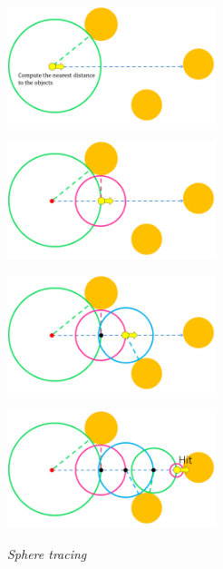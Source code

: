 \begin{figure}[htbp]
 \begin{minipage}[t]{0.5\hsize}
  \center
  \includegraphics[height=1.35in, keepaspectratio]{img/visualization/sphereTracing1.png}
  \subcaption{\textit{}}
  \label{fig:st1}
  \hspace*{\fill}
 \end{minipage}
 \begin{minipage}[t]{0.5\hsize}
  \center
  \includegraphics[height=1.35in, keepaspectratio]{img/visualization/sphereTracing2.png}
  \subcaption{\textit{}}
  \label{fig:st2}
  \hspace*{\fill}
 \end{minipage}
 \begin{minipage}[t]{0.5\hsize}
  \center
  \includegraphics[height=1.35in, keepaspectratio]{img/visualization/sphereTracing3.png}
  \subcaption{\textit{}}
  \label{fig:st3}
  \hspace*{\fill}
 \end{minipage}
 \begin{minipage}[t]{0.5\hsize}
  \center
  \includegraphics[height=1.35in, keepaspectratio]{img/visualization/sphereTracing4.png}
  \subcaption{\textit{}}
  \label{fig:st4}
  \hspace*{\fill}
 \end{minipage}
 \caption{\textit{Sphere tracing}}
 \label{fig:sphereTracing}
\end{figure}

